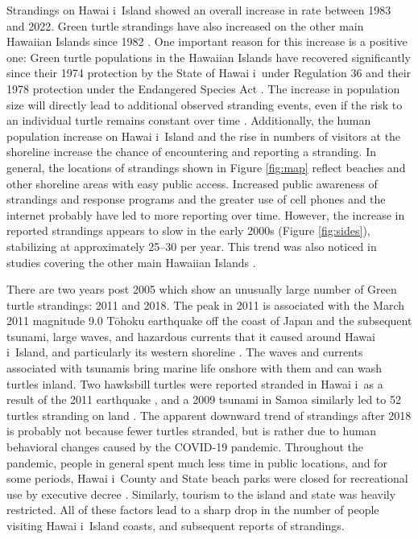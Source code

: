 \documentclass[sn-basic,NameDate]{sn-jnl}\usepackage[]{graphicx}\usepackage[]{xcolor}
\DeclareRobustCommand{\okina}{%
  \raisebox{\dimexpr\fontcharht\font`A-\height}{%
    \scalebox{0.8}{`}%
  }%
}
\newcommand{\Hawaii}{Hawai\okina i}
\begin{document}
Strandings on \Hawaii\ Island showed an overall increase in rate between 1983 and 2022. Green turtle strandings have also increased on the other main Hawaiian Islands since 1982 \citep{chaloupka2008cause}.
One important reason for this increase is a positive one: Green turtle populations in the Hawaiian Islands have recovered significantly since their 1974 protection by the State of \Hawaii\ under Regulation 36 and their 1978 protection under the Endangered Species Act \citep{balazs2004thirty, bennett2008book}.
The increase in population size will directly lead to additional observed stranding events, even if the risk to an individual turtle remains constant over time \citep{boulon2000trends}. 
Additionally, the human population increase on \Hawaii\ Island and the rise in numbers of visitors at the shoreline increase the chance of encountering and reporting a stranding. 
In general, the locations of strandings shown in Figure \ref{fig:map} reflect beaches and other shoreline areas with easy public access.
Increased public awareness of strandings and response programs and the greater use of cell phones and the internet probably have led to more reporting over time.
However, the increase in reported strandings appears to slow in the early 2000s (Figure \ref{fig:sides}), stabilizing at approximately 25--30 per year.
This trend was also noticed in studies covering the other main Hawaiian Islands \citep{chaloupka2008cause}. 

There are two years post 2005 which show an unusually large number of Green turtle strandings: 2011 and 2018. The peak in 2011 is associated with the March 2011 magnitude 9.0 T\={o}hoku earthquake off the coast of Japan and the subsequent tsunami, large waves, and hazardous currents that it caused around \Hawaii\ Island, and particularly its western shoreline \citep{cheung2013surges}. 
The waves and currents associated with tsunamis bring marine life onshore with them and can wash turtles inland. 
Two hawksbill turtles were reported stranded in \Hawaii\ as a result of the 2011 earthquake \citep{brunson2022three}, and a 2009 tsunami in Samoa similarly led to 52 turtles stranding on land \citep{bell2011marine}. 
The apparent downward trend of strandings after 2018 is probably not because fewer turtles stranded, but is rather due to human behavioral changes caused by the COVID-19 pandemic.
Throughout the pandemic, people in general spent much less time in public locations, and for some periods, \Hawaii\ County and State beach parks were closed for recreational use by executive decree \citep{emergencyNo2, emergencyFifth}.
Similarly, tourism to the island and state was heavily restricted.
All of these factors lead to a sharp drop in the number of people visiting \Hawaii\ Island coasts, and subsequent reports of strandings. 
\end{document}

